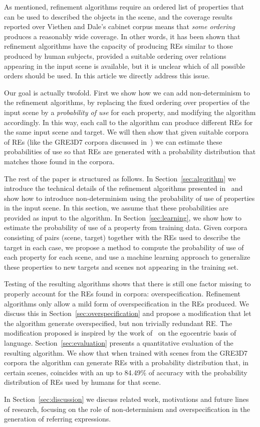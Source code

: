 As mentioned, refinement algorithms require an 
ordered list of properties that can be used to described the objects in the scene, and the coverage results reported over Viethen and 
Dale's cabinet corpus means that \emph{some ordering} produces a reasonably wide coverage.  In other words, it has been shown that refinement algorithms have the capacity of producing REs similar to those produced by human subjects, provided a suitable ordering over relations appearing 
in the input scene is available, but it is unclear which of all possible orders should be used.  In this article we directly address this issue.  

Our goal is actually twofold. First we show how we can add non-determinism to the refinement algorithms, by replacing the fixed ordering 
over properties of the input scene by a \emph{probability of use} for each property, and modifying the algorithm accordingly.  
In this way, each call to the algorithm can produce different REs for the same input scene and target.  We will then show that given suitable corpora of REs (like the GRE3D7 corpora discussed in~\cite{viet:gene11}) we can estimate these probabilities of use so that REs are generated with a probability distribution that matches those found in the corpora.  

The rest of the paper is structured as follows. In Section~\ref{sec:algorithm} we introduce the technical details of the 
refinement algorithms presented in~\cite{arec2:2008:Areces,arec:usin11} and show how to introduce non-determinism using 
the probability of use of properties in the input scene.  In this section, we assume that these probabilities are provided as 
input to the algorithm. In Section~\ref{sec:learning}, we show how to estimate the 
probability of use of a property from training data. Given corpora consisting of pairs (scene, target) together with the REs used to 
describe the target in each case, we propose a method to compute the probability of use of each property for each scene, and use a machine learning approach to generalize these properties to new targets and scenes not appearing in the training set. 

Testing of the resulting algorithms shows that there is still one factor missing to properly account for the REs found in corpora: overspecification.  Refinement algorithms only allow a mild form of overspecification in the REs produced.  We discuss this in Section~\ref{sec:overspecification} and propose a modification that let the algorithm generate overspecified, but non trivially redundant RE.  The modification proposed is inspired by the work of~ on the egocentric basis of language.  
Section~\ref{sec:evaluation} presents a quantitative evaluation of the resulting algorithm. We show that when trained with scenes from the GRE3D7 corpora the algorithm can generate REs with a probability distribution that, in certain scenes, coincides with an up to 84.49\% of accuracy with the probability distribution of REs used by humans for that scene. 

In Section~\ref{sec:discussion} we discuss related work, motivations and future lines of research, focusing on the role of non-determinism and overspecification in the generation of referring expressions. 

